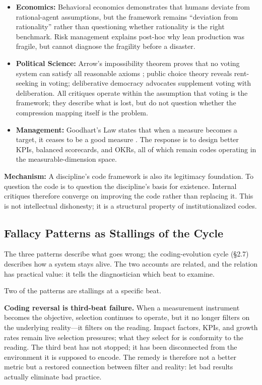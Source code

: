 \documentclass[11pt,a4paper]{article}
\begin{document}
\begin{itemize}
    \item \textbf{Economics:} Behavioral economics demonstrates that humans deviate from rational-agent assumptions, but the framework remains ``deviation from rationality'' rather than questioning whether rationality is the right benchmark. Risk management explains post-hoc why lean production was fragile, but cannot diagnose the fragility before a disaster.

    \item \textbf{Political Science:} Arrow's impossibility theorem proves that no voting system can satisfy all reasonable axioms \citep{arrow1951}; public choice theory reveals rent-seeking in voting; deliberative democracy advocates supplement voting with deliberation. All critiques operate within the assumption that voting is the framework; they describe what is lost, but do not question whether the compression mapping itself is the problem.

    \item \textbf{Management:} Goodhart's Law states that when a measure becomes a target, it ceases to be a good measure \citep{goodhart1975}. The response is to design better KPIs, balanced scorecards, and OKRs, all of which remain codes operating in the measurable-dimension space.
\end{itemize}

\textbf{Mechanism:} A discipline's code framework is also its legitimacy foundation. To question the code is to question the discipline's basis for existence. Internal critiques therefore converge on improving the code rather than replacing it. This is not intellectual dishonesty; it is a structural property of institutionalized codes.

\subsection{Fallacy Patterns as Stallings of the Cycle}

The three patterns describe what goes wrong; the coding-evolution cycle (\S2.7) describes how a system stays alive. The two accounts are related, and the relation has practical value: it tells the diagnostician which beat to examine.

Two of the patterns are stallings at a specific beat.

\textbf{Coding reversal is third-beat failure.} When a measurement instrument becomes the objective, selection continues to operate, but it no longer filters on the underlying reality---it filters on the reading. Impact factors, KPIs, and growth rates remain live selection pressures; what they select for is conformity to the reading. The third beat has not stopped; it has been disconnected from the environment it is supposed to encode. The remedy is therefore not a better metric but a restored connection between filter and reality: let bad results actually eliminate bad practice.
\end{document}
